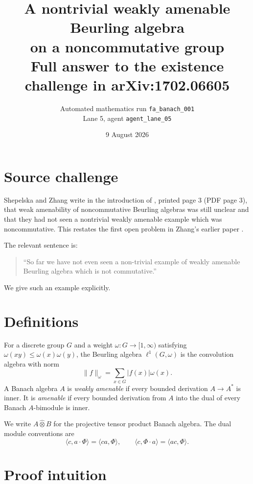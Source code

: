 \documentclass[11pt]{article}
\title{A nontrivial weakly amenable Beurling algebra\\
on a noncommutative group\\
\large Full answer to the existence challenge in arXiv:1702.06605}
\author{Automated mathematics run \texttt{fa\_banach\_001}\\
Lane 5, agent \texttt{agent\_lane\_05}}
\date{9 August 2026}
\begin{document}
\maketitle

\begin{center}
\end{center}

\section{Source challenge}

Shepelska and Zhang write in the introduction of \cite{SZ}, printed page 3
(PDF page 3), that weak amenability of noncommutative Beurling algebras was
still unclear and that they had not seen a nontrivial weakly amenable example
which was noncommutative.  This restates the first open problem in
Zhang's earlier paper \cite{Zhang}.

The relevant sentence is:
\begin{quote}
``So far we have not even seen a non-trivial example of weakly amenable
Beurling algebra which is not commutative.''
\end{quote}
We give such an example explicitly.

\section{Definitions}

For a discrete group $G$ and a weight $\omega:G\to[1,\infty)$ satisfying
$\omega(xy)\leq\omega(x)\omega(y)$, the Beurling algebra
$\ell^1(G,\omega)$ is the convolution algebra with norm
\[
       \|f\|_\omega=\sum_{x\in G}|f(x)|\omega(x).
\]
A Banach algebra $A$ is \emph{weakly amenable} if every bounded derivation
$A\to A^*$ is inner.  It is \emph{amenable} if every bounded derivation from
$A$ into the dual of every Banach $A$-bimodule is inner.

We write $A\widehat\otimes B$ for the projective tensor product Banach
algebra.  The dual module conventions are
\[
 \langle c,a\cdot\Phi\rangle=\langle ca,\Phi\rangle,
 \qquad
 \langle c,\Phi\cdot a\rangle=\langle ac,\Phi\rangle.
\]

\section{Proof intuition}
\end{document}
